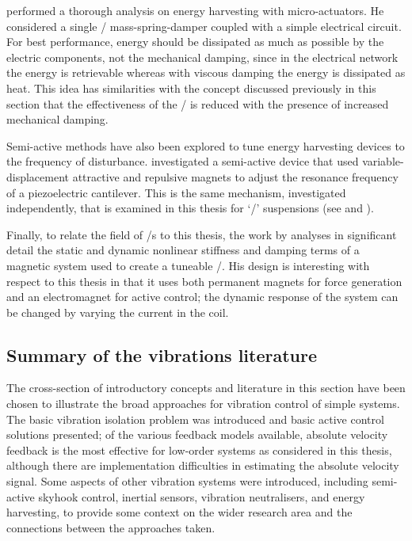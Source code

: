 \documentclass[11pt,a4paper]{memoir}
\begin{document}
\textcite{stephen2006} performed a thorough analysis on energy harvesting with micro-actuators.
He considered a single \dof/ mass-spring-damper coupled with a simple electrical circuit.
For best performance, energy should be dissipated as much as possible by the electric components, not the mechanical damping, since in the electrical network the energy is retrievable whereas with viscous damping the energy is dissipated as heat.
This idea has similarities with the concept discussed previously in this section that the effectiveness of the \vibneut/ is reduced with the presence of increased mechanical damping.

Semi-active methods have also been explored to tune energy harvesting devices to the frequency of disturbance.
\textcite{challa2008} investigated a semi-active device that used variable-displacement attractive and repulsive magnets to adjust the resonance frequency of a piezoelectric cantilever.
This is the same mechanism, investigated independently, that is examined in this thesis for `\qzs/' suspensions (see  and ).

Finally, to relate the field of \vibneut/s to this thesis, the work by \textcite{tentor2001} analyses in significant detail the static and dynamic nonlinear stiffness and damping terms of a magnetic system used to create a tuneable \vibneut/.
His design is interesting with respect to this thesis in that it uses both permanent magnets for force generation and an electromagnet for active control; the dynamic response of the system can be changed by varying the current in the coil.



\subsection{Summary of the vibrations literature}

The cross-section of introductory concepts and literature in this section have been chosen to illustrate the broad approaches for vibration control of simple systems.
The basic vibration isolation problem was introduced and basic active control solutions presented; of the various feedback models available, absolute velocity feedback is the most effective for low-order systems as considered in this thesis, although there are implementation difficulties in estimating the absolute velocity signal.
Some aspects of other vibration systems were introduced, including semi-active skyhook control, inertial sensors, vibration neutralisers, and energy harvesting, to provide some context on the wider research area and the connections between the approaches taken.
\end{document}
